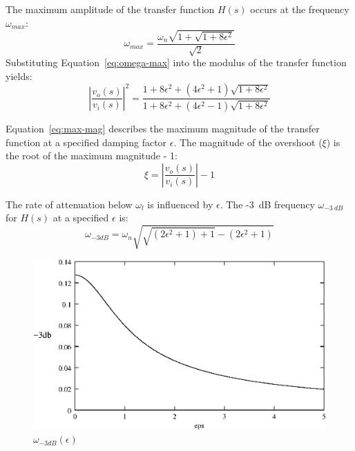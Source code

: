 The maximum amplitude of the transfer function $H(s)$ occurs at the
frequency $\omega_{max}$:
\begin{equation}
	\omega_{max} = \frac{\omega_n\sqrt{1 + \sqrt{1 +
	8\epsilon^2}}}{\sqrt{2}}
	\label{eq:omega-max}
\end{equation}
Substituting Equation~\ref{eq:omega-max} into the modulus of the
transfer function yields:
\begin{equation}
	\left | \frac{v_o(s)}{v_i(s)} \right | ^2 = \frac{1 + 8\epsilon^2 +
	(4\epsilon^2 + 1)\sqrt{1 + 8\epsilon^2}}{1 + 8\epsilon^2 +
	(4\epsilon^2 - 1)\sqrt{1 + 8\epsilon^2}}
	\label{eq:max-mag}
\end{equation}

Equation~\ref{eq:max-mag} describes the maximum magnitude of the
transfer function at a specified damping factor $\epsilon$. The
magnitude of the overshoot ($\xi$) is the root of the maximum
magnitude - 1:
\begin{equation}
	\xi = \left | \frac{v_o(s)}{v_i(s)} \right | - 1
	\label{eq:overshoot}
\end{equation}

The rate of attenuation below $\omega_l$ is influenced by
$\epsilon$. The -3~dB frequency $\omega_{-3~dB}$ for $H(s)$
at a specified $\epsilon$ is:
\begin{equation}
	\omega_{-3dB} = \omega_n\sqrt{\sqrt{(2\epsilon^2 + 1) + 1} -
	(2\epsilon^2 + 1)}
	\label{eq:wm1}
\end{equation}

\begin{figure}[htbp]
	\begin{center}
	\includegraphics[width=\textwidth]{3db.eps}
	\caption{$\omega_{-3dB}(\epsilon)$}
	\label{fig:3db}
	\end{center}
\end{figure}

